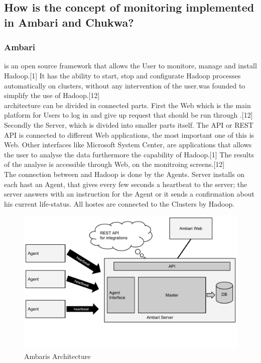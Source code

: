 \subsection{How is the concept of monitoring implemented in Ambari and Chukwa?}
\label{subsec:Implementation}

\subsubsection{Ambari}
\amb is an open source framework that allows the User to monitore, manage and install Hadoop.[1] It has the ability to start, stop and configurate Hadoop processes automatically on clusters, without any intervention of the user.\amb was founded to simplify the use of Hadoop.[12]
\\
\amb architecture can be divided in connected parts. First the \amb Web which is the main platform for Users to log in and give up request that should be run through \amb.[12] Secondly the \amb Server, which is divided into smaller parts itself. The API or REST API is connected to different Web applications, the most important one of this is \amb Web. Other interfaces like Microsoft System Center, are applications that allows the user to analyse the data furthermore the capability of Hadoop.[1] The results of the analyse is accessible through \amb Web, on the monitroing screens.[12]
\\
The connection between \amb and Hadoop is done by the \amb Agents. \amb Server installs on each hast an \amb Agent, that gives every few seconds a heartbeat to the server; the server answers with an instruction for the Agent or it sends a confirmation about his current life-status. All hostes are connected to the Clusters by Hadoop.
\\
\begin{figure}[hbt]
  \centering
  \includegraphics[width=\linewidth,clip=true,trim=0 3cm 0 0]{images/AmbariArchitecture}
  \caption{Ambaris Architecture~\cite{Sako}}
  \label{fig:AmbariArchitecture}
\end{figure}

